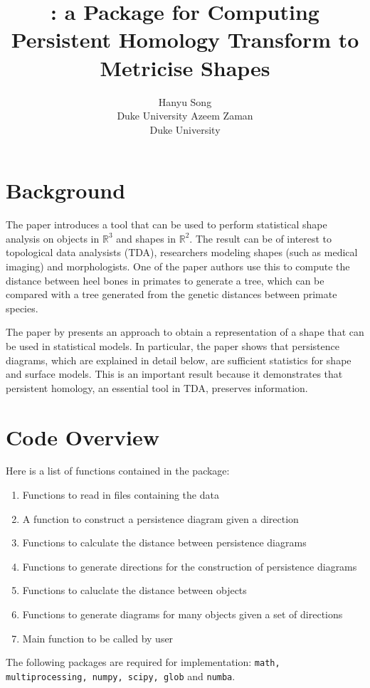 \documentclass[codesnippet]{jss}
\author{Hanyu Song\\Duke University \And 
        Azeem Zaman\\Duke University}
\title{\pkg{PHT}: a \proglang{Python} Package for Computing Persistent Homology Transform to Metricise Shapes}
\begin{document}
\section[Background]{Background}The paper introduces a tool that can be used to perform statistical shape analysis on objects in $\mathbb{R}^3$ and shapes in $\mathbb{R}^2$.  The result can be of interest to topological data analysists (TDA), researchers modeling shapes (such as medical imaging) and morphologists. One of the paper authors use this to compute the distance between heel bones in primates to generate a tree, which can be compared with a tree generated from the genetic distances between primate species.  

The paper by \cite{foo2010} presents an approach to obtain a representation of a shape that can be used in statistical models.  In particular, the paper shows that persistence diagrams, which are explained in detail below, are sufficient statistics for shape and surface models.  This is an important result because it demonstrates that persistent homology, an essential tool in TDA, preserves information.  

\section[Code Overview]{Code Overview}
Here is a list of functions contained in the package:
\begin{enumerate}
\item{Functions to read in files containing the data}
\item{A function to construct a persistence diagram given a direction}
\item{Functions to calculate the distance between persistence diagrams}
\item{Functions to generate directions for the construction of persistence diagrams}
\item{Functions to caluclate the distance between objects}
\item{Functions to generate diagrams for many objects given a set of directions}
\item{Main function to be called by user}
\end{enumerate}
The following packages are required for implementation: \texttt{math, multiprocessing, numpy, scipy, glob} and \texttt{numba}.
\end{document}
